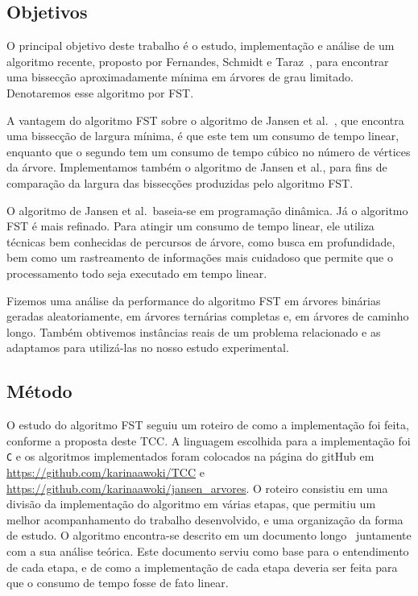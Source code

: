 \subsection{Objetivos} 

O principal objetivo deste trabalho é o estudo, implementação e 
análise de um algoritmo recente, proposto por Fernandes, Schmidt e 
Taraz~\cite{FernandesST13}, para encontrar uma bissecção 
aproximadamente mínima em árvores de grau limitado. Denotaremos
esse algoritmo por FST. 

A vantagem do algoritmo FST sobre o algoritmo de Jansen et 
al.~\cite{JansenKLS01}, que encontra uma bissecção de largura 
mínima, é que este tem um consumo de tempo linear, enquanto que o 
segundo tem um consumo de tempo cúbico no número de vértices da 
árvore. 
Implementamos também o algoritmo de Jansen et al., para fins de 
comparação da largura das bissecções produzidas pelo algoritmo
FST. 

O algoritmo de Jansen et al.\ baseia-se em 
programação dinâmica. 
Já o algoritmo FST é mais refinado. 
Para atingir um consumo de tempo 
linear, ele utiliza técnicas bem conhecidas de percursos de árvore, 
como busca em profundidade, bem como um rastreamento de 
informações mais cuidadoso que permite que o processamento todo 
seja executado em tempo linear. 

Fizemos uma análise 
da performance do algoritmo FST em árvores binárias geradas 
aleatoriamente,
em árvores ternárias completas e,
em árvores de caminho longo.
Também obtivemos instâncias reais de um problema relacionado e as
adaptamos para 
utilizá-las no nosso estudo experimental.
 

\bigskip
\bigskip


\subsection{Método}

O estudo do algoritmo FST seguiu um roteiro de
como a implementação foi feita, conforme a proposta deste TCC. 
A linguagem escolhida para a implementação foi \texttt{C} e os 
algoritmos implementados foram colocados na página do gitHub
em \url{https://github.com/karinaawoki/TCC} e
\url{https://github.com/karinaawoki/jansen_arvores}. 
O roteiro consistiu em uma divisão da implementação do algoritmo 
em várias etapas, que permitiu um melhor acompanhamento do 
trabalho desenvolvido, e uma organização da forma de estudo. 
O algoritmo encontra-se descrito em um documento 
longo~\cite{Schmidt15} juntamente com a sua análise teórica. 
Este documento serviu como base para o entendimento de cada 
etapa, e de como a implementação de cada etapa deveria ser feita 
para que o consumo de tempo fosse de fato linear. 

